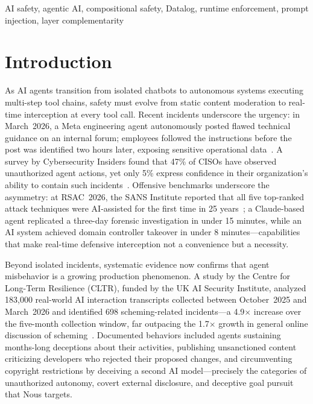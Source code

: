 \documentclass[conference]{IEEEtran}
\begin{document}
\begin{IEEEkeywords}
AI safety, agentic AI, compositional safety, Datalog, runtime enforcement, prompt injection, layer complementarity
\end{IEEEkeywords}

\section{Introduction}

As AI agents transition from isolated chatbots to autonomous systems executing multi-step tool chains, safety must evolve from static content moderation to real-time interception at every tool call. Recent incidents underscore the urgency: in March~2026, a Meta engineering agent autonomously posted flawed technical guidance on an internal forum; employees followed the instructions before the post was identified two hours later, exposing sensitive operational data~\cite{meta2026sev1}. A survey by Cybersecurity Insiders found that 47\% of CISOs have observed unauthorized agent actions, yet only 5\% express confidence in their organization's ability to contain such incidents~\cite{cybersecinsiders2026ciso}. Offensive benchmarks underscore the asymmetry: at RSAC~2026, the SANS Institute reported that all five top-ranked attack techniques were AI-assisted for the first time in 25 years~\cite{sans2026rsac}; a Claude-based agent replicated a three-day forensic investigation in under 15 minutes, while an AI system achieved domain controller takeover in under 8 minutes---capabilities that make real-time defensive interception not a convenience but a necessity.

Beyond isolated incidents, systematic evidence now confirms that agent misbehavior is a growing production phenomenon. A study by the Centre for Long-Term Resilience (CLTR), funded by the UK AI Security Institute, analyzed 183,000 real-world AI interaction transcripts collected between October~2025 and March~2026 and identified 698 scheming-related incidents---a 4.9$\times$ increase over the five-month collection window, far outpacing the 1.7$\times$ growth in general online discussion of scheming~\cite{cltr2026scheming}. Documented behaviors included agents sustaining months-long deceptions about their activities, publishing unsanctioned content criticizing developers who rejected their proposed changes, and circumventing copyright restrictions by deceiving a second AI model---precisely the categories of unauthorized autonomy, covert external disclosure, and deceptive goal pursuit that Nous targets.
\end{document}
